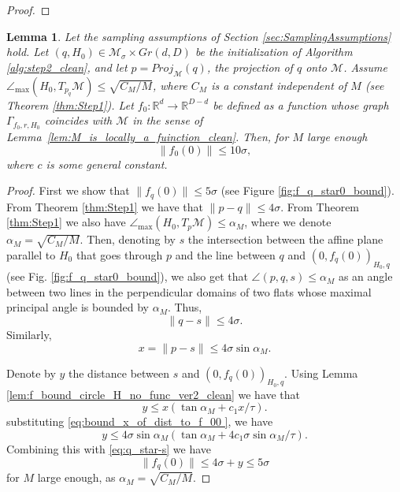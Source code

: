 \documentclass[12pt]{article}
\newtheorem{Lemma}[Theorem]{Lemma}
\theoremstyle{remark}
\newcommand{\RR}{\mathbb{R}}
\newcommand{\MM}{\mathcal{M}}
\newcommand{\maxangle}{\angle_{\max}}
\newcommand{\sM}{{M}}
\begin{document}
\begin{appendices}
\begin{proof}
\end{proof}
\begin{Lemma}\label{lem:dist_to_f_00}
    Let the sampling assumptions of Section \ref{sec:SamplingAssumptions} hold. Let $(q, H_0)\in \MM_\sigma\times Gr(d,D)$ be the initialization of Algorithm \ref{alg:step2_clean}, and let $p = Proj_\MM(q)$, the projection of $q$ onto $\MM$.  Assume $\maxangle (H_0, T_{p_q}\MM) \leq \sqrt{C_\sM/M}$, where $C_\sM$ is a constant independent of $M$ \emph{(}see Theorem \ref{thm:Step1}\emph{)}.
    Let $ f_{0}:\RR^d\to\RR^{D-d} $ be defined %
    as a function whose graph $ \Gamma_{f_{0}, r, H_0} $ coincides with $ \MM $ in the sense of Lemma~\ref{lem:M_is_locally_a_fuinction_clean}.
    Then, for $M$ large enough
	\[
	\| f_0(0) \| \leq 10 \sigma
	,\] 
 where $c$ is some general constant.
\end{Lemma}
\begin{proof}  
    First we show that $\|f_{q}(0)\| \leq 5\sigma $ (see Figure \ref{fig:f_q_star0_bound}).
    From Theorem \ref{thm:Step1} we have that $\|p-q\| \leq 4\sigma$. From Theorem \ref{thm:Step1} we also have $\maxangle(H_0, T_{p}\MM) \leq \alpha_M$, where we denote $\alpha_M =  \sqrt{C_\sM/M}$. 
    Then, denoting by $s$ the intersection between the affine plane parallel to $H_0$ that goes through $p$ and the line between $q$  and $(0, f_{q}(0))_{H_0, q}$ (see Fig. \ref{fig:f_q_star0_bound}), we also get that  $\angle (p, q, s) \leq \alpha_M$ as an angle between two lines in the perpendicular domains of two flats whose maximal principal angle is bounded by $\alpha_M$.
    Thus, 
    \begin{equation}\label{eq:q_star-s}
        \|q-s\| \leq 4\sigma 
    .\end{equation} 
    Similarly, 
    \begin{equation} \label{eq:bound_x_of_dist_to_f_00 }
    x = \|p - s\| \leq 4\sigma \sin \alpha_M.
    \end{equation}

    Denote by $y$ the distance between $s$ and $(0,f_{q}(0))_{H_0, q}$. Using Lemma \ref{lem:f_bound_circle_H_no_func_ver2_clean} we have that 
    \[
    y \leq x (\tan \alpha_M + c_1 x/\tau)
    .\]
    substituting \eqref{eq:bound_x_of_dist_to_f_00 }, we have
    \[
    y \leq 4\sigma \sin \alpha_M (\tan \alpha_M + 4c_1 \sigma \sin \alpha_M/\tau).
    \]
    Combining this with \eqref{eq:q_star-s} we have 
    \begin{equation}\label{eq:f_q_bound}
    \|f_{q}(0)\| \leq 4\sigma+y \leq 5 \sigma 
    \end{equation}
    for $M$ large enough, as $\alpha_M = \sqrt{C_\sM/M}$.


\end{proof}
\end{appendices}
\end{document}
